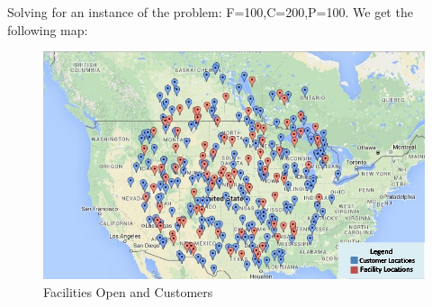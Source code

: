 \documentclass[12pt]{article}
\numberwithin{equation}{section}
\begin{document}
Solving for an instance of the problem: F=100,C=200,P=100. We get the following map:
\begin{figure}[H]
\centering
  \includegraphics[width=\linewidth]{map.jpg}
  \caption{Facilities Open and Customers}
  \label{fig:optimalmap}
\end{figure}
\end{document}
